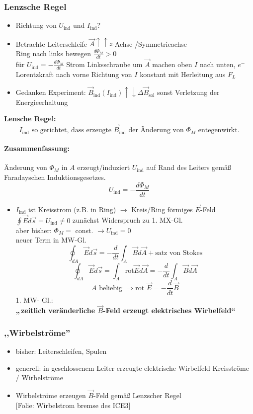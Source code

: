 \documentclass[titlepage,12pt,a4paper,ngerman]{report}
\newcommand{\tx}[1]{\textrm{#1}}
\newcommand{\uind}{U_{\tx{ind}}}
\newcommand{\folie}[1]{\color{gray}[Folie: #1]\color{black}}
\begin{document}
\subsubsection{Lenzsche Regel}
\begin{itemize}
	\item Richtung von $\uind$ und $I_{\tx{ind}}$?
	\item Betrachte Leiterschleife $\vec{A} \uparrow \uparrow z$-Achse /Symmetrieachse\\
	Ring nach links bewegen $\frac{d\Phi_M}{dt}>0$\\
	für $\uind = - \frac{d\Phi_M}{dt}$ Strom Linksschraube um $\vec{A}$ machen oben $I$ nach unten, $e^-$ Lorentzkraft nach vorne Richtung von $I$ konstant mit Herleitung aus $F_L$
	\item Gedanken Experiment: $\vec{B}_{\tx{ind}}(I_{\tx{ind}}) \uparrow \downarrow \Delta \vec{B}_{\tx{sol}}$ sonst Verletzung der Energieerhaltung
\end{itemize}
\textbf{Lensche Regel:}
$$\boxed{I_{\tx{ind}} \tx{ so gerichtet, dass erzeugte }\vec{B}_{\tx{ind}}\tx{ der Änderung von }\Phi_M \tx{ entegenwirkt.}}$$

\paragraph{Zusammenfassung:}
Änderung von $\Phi_M$ in $A$ erzeugt/induziert $\uind$ auf Rand des Leiters gemäß Faradayschen Induktionsgesetzes.
$$\boxed{\uind= -\frac{d \Phi_M}{dt}}$$
\begin{itemize}
	\item $I_{\tx{ind}}$ ist Kreisstrom (z.B. in Ring)
	$\rightarrow$ Kreis/Ring förmiges $\vec{E}$-Feld\\
	$\oint \vec{E}d \vec{s} = \uind \neq 0$ zunächst Widerspruch zu 1. MX-Gl.\\
	aber bisher: $\Phi_M = $ const. $\rightarrow \uind =0$\\
	neuer Term in MW-Gl.
	$$\boxed{\oint_{dA} \vec{E}d \vec{s} = - \frac{d}{dt}\int_A \vec{B} d \vec{A} + \tx{satz von Stokes}}$$
	$$\oint_{dA} \vec{E}d \vec{s} = \int_A \tx{rot} \vec{E}d \vec{A} = - \frac{d}{dt}\int_A \vec{B}d \vec{A}$$
	$$A \tx{ beliebig } \Rightarrow \boxed{\tx{rot } \vec{E}= -\frac{d}{dt}\vec{B}}$$
	1. MW- Gl.:\\
	\textbf{„$ \, $zeitlich veränderliche $\vec{B}$-Feld erzeugt elektrisches Wirbelfeld“}
\end{itemize}
\subsubsection{,,Wirbelströme''}
\begin{itemize}
	\item bisher: Leiterschleifen, Spulen
	\item generell: in geschlossenem Leiter erzeugte elektrische Wirbelfeld Kreisströme / Wirbelströme
	\item Wirbelströme erzeugen $\vec{B}$-Feld gemäß Lenzscher Regel\\
	\folie{Wirbelstrom bremse des ICE3}
\end{itemize}
\end{document}

